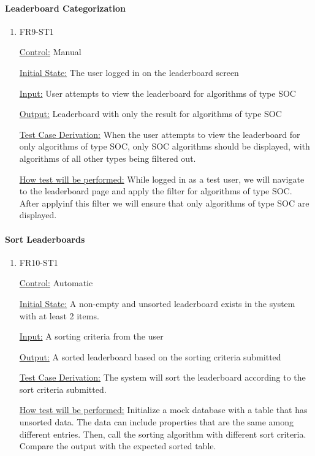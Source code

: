 \documentclass[12pt, titlepage]{article}
\begin{document}
\paragraph{Leaderboard Categorization}

\begin{enumerate}

\item{FR9-ST1\\}

\underline{Control:} Manual

\underline{Initial State:} The user logged in on the leaderboard screen

\underline{Input:} User attempts to view the leaderboard for algorithms of type SOC

\underline{Output:} Leaderboard with only the result for algorithms of type SOC

\underline{Test Case Derivation:} When the user attempts to view the leaderboard for only algorithms of type SOC, only SOC algorithms should be displayed, with algorithms of all other types being filtered out.

\underline{How test will be performed:} While logged in as a test user, we will navigate to the leaderboard page and apply the filter for algorithms of type SOC. After applyinf this filter we will ensure that only algorithms of type SOC are displayed.

\end{enumerate}

\paragraph{Sort Leaderboards}

\begin{enumerate}

\item{FR10-ST1\\}

\underline{Control:} Automatic

\underline{Initial State:} A non-empty and unsorted leaderboard exists in the system with at least 2 items.

\underline{Input:} A sorting criteria from the user

\underline{Output:} A sorted leaderboard based on the sorting criteria submitted

\underline{Test Case Derivation:} The system will sort the leaderboard according to the sort criteria submitted.

\underline{How test will be performed:} Initialize a mock database with a table that has unsorted data. The data can include properties that are the same among different entries. Then, call the sorting algorithm with different sort criteria. Compare the output with the expected sorted table.

\end{enumerate}
\end{document}
